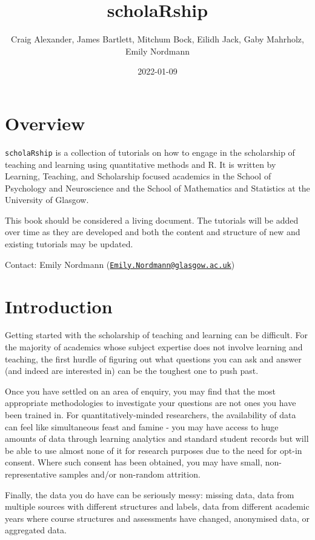 \documentclass[
  oneside]{book}
\title{scholaRship}
\author{Craig Alexander, James Bartlett, Mitchum Bock, Eilidh Jack, Gaby Mahrholz, Emily Nordmann}
\date{2022-01-09}
\begin{document}
\maketitle

{
\setcounter{tocdepth}{1}
\tableofcontents
}
\hypertarget{overview}{%
\chapter*{Overview}\label{overview}}

\texttt{scholaRship} is a collection of tutorials on how to engage in the scholarship of teaching and learning using quantitative methods and R. It is written by Learning, Teaching, and Scholarship focused academics in the School of Psychology and Neuroscience and the School of Mathematics and Statistics at the University of Glasgow.

This book should be considered a living document. The tutorials will be added over time as they are developed and both the content and structure of new and existing tutorials may be updated.

Contact: Emily Nordmann (\href{mailto:Emily.Nordmann@glasgow.ac.uk}{\nolinkurl{Emily.Nordmann@glasgow.ac.uk}})

\hypertarget{intro}{%
\chapter{Introduction}\label{intro}}

Getting started with the scholarship of teaching and learning can be difficult. For the majority of academics whose subject expertise does not involve learning and teaching, the first hurdle of figuring out what questions you can ask and answer (and indeed are interested in) can be the toughest one to push past.

Once you have settled on an area of enquiry, you may find that the most appropriate methodologies to investigate your questions are not ones you have been trained in. For quantitatively-minded researchers, the availability of data can feel like simultaneous feast and famine - you may have access to huge amounts of data through learning analytics and standard student records but will be able to use almost none of it for research purposes due to the need for opt-in consent. Where such consent has been obtained, you may have small, non-representative samples and/or non-random attrition.

Finally, the data you do have can be seriously messy: missing data, data from multiple sources with different structures and labels, data from different academic years where course structures and assessments have changed, anonymised data, or aggregated data.
\end{document}
